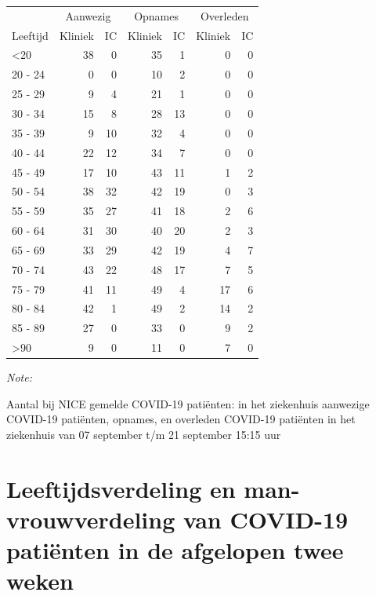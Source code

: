 \documentclass[
  english,
  man,floatsintext]{apa6}
\begin{document}
\begin{table}
\centering\begingroup\fontsize{10}{12}\selectfont

\begin{threeparttable}
\begin{tabular}{lrrrrrr}
\toprule
\multicolumn{1}{c}{ } & \multicolumn{2}{c}{Aanwezig} & \multicolumn{2}{c}{Opnames} & \multicolumn{2}{c}{Overleden} \\
\cmidrule(l{3pt}r{3pt}){2-3} \cmidrule(l{3pt}r{3pt}){4-5} \cmidrule(l{3pt}r{3pt}){6-7}
Leeftijd & Kliniek & IC & Kliniek & IC & Kliniek & IC\\
\midrule
<20 & 38 & 0 & 35 & 1 & 0 & 0\\
20 - 24 & 0 & 0 & 10 & 2 & 0 & 0\\
25 - 29 & 9 & 4 & 21 & 1 & 0 & 0\\
30 - 34 & 15 & 8 & 28 & 13 & 0 & 0\\
35 - 39 & 9 & 10 & 32 & 4 & 0 & 0\\
40 - 44 & 22 & 12 & 34 & 7 & 0 & 0\\
45 - 49 & 17 & 10 & 43 & 11 & 1 & 2\\
50 - 54 & 38 & 32 & 42 & 19 & 0 & 3\\
55 - 59 & 35 & 27 & 41 & 18 & 2 & 6\\
60 - 64 & 31 & 30 & 40 & 20 & 2 & 3\\
65 - 69 & 33 & 29 & 42 & 19 & 4 & 7\\
70 - 74 & 43 & 22 & 48 & 17 & 7 & 5\\
75 - 79 & 41 & 11 & 49 & 4 & 17 & 6\\
80 - 84 & 42 & 1 & 49 & 2 & 14 & 2\\
85 - 89 & 27 & 0 & 33 & 0 & 9 & 2\\
>90 & 9 & 0 & 11 & 0 & 7 & 0\\
\bottomrule
\end{tabular}
\begin{tablenotes}
\item \textit{Note: } 
\item Aantal bij NICE gemelde COVID-19 patiënten: in het ziekenhuis aanwezige COVID-19 patiënten, opnames, en overleden COVID-19 patiënten in het ziekenhuis van 07 september t/m 21 september 15:15 uur
\end{tablenotes}
\end{threeparttable}
\endgroup{}
\end{table}

\newpage

\hypertarget{leeftijdsverdeling-en-man-vrouwverdeling-van-covid-19-patiuxebnten-in-de-afgelopen-twee-weken}{%
\section{Leeftijdsverdeling en man-vrouwverdeling van COVID-19 patiënten in de afgelopen twee weken}\label{leeftijdsverdeling-en-man-vrouwverdeling-van-covid-19-patiuxebnten-in-de-afgelopen-twee-weken}}
\end{document}

